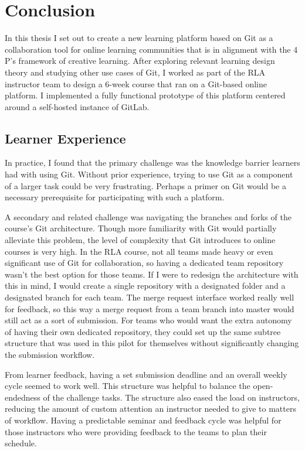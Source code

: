 \documentclass[12pt,twoside]{mitthesis}
\begin{document}
\chapter{Conclusion}

In this thesis I set out to create a new learning platform based on Git as a collaboration tool for online learning communities that is in alignment with the 4 P's framework of creative learning. After exploring relevant learning design theory and studying other use cases of Git, I worked as part of the RLA instructor team to design a 6-week course that ran on a Git-based online platform. I implemented a fully functional prototype of this platform centered around a self-hosted instance of GitLab.

\section{Learner Experience}

In practice, I found that the primary challenge was the knowledge barrier learners had with using Git. Without prior experience, trying to use Git as a component of a larger task could be very frustrating. Perhaps a primer on Git would be a necessary prerequisite for participating with such a platform. 

A secondary and related challenge was navigating the branches and forks of the course's Git architecture. Though more familiarity with Git would partially alleviate this problem, the level of complexity that Git introduces to online courses is very high. In the RLA course, not all teams made heavy or even significant use of Git for collaboration, so having a dedicated team repository wasn't the best option for those teams. If I were to redesign the architecture with this in mind, I would create a single repository with a designated folder and a designated branch for each team. The merge request interface worked really well for feedback, so this way a merge request from a team branch into master would still act as a sort of submission. For teams who would want the extra autonomy of having their own dedicated repository, they could set up the same subtree structure that was used in this pilot for themselves without significantly changing the submission workflow.

From learner feedback, having a set submission deadline and an overall weekly cycle seemed to work well. This structure was helpful to balance the open-endedness of the challenge tasks. The structure also eased the load on instructors, reducing the amount of custom attention an instructor needed to give to matters of workflow. Having a predictable seminar and feedback cycle was helpful for those instructors who were providing feedback to the teams to plan their schedule.
\end{document}
